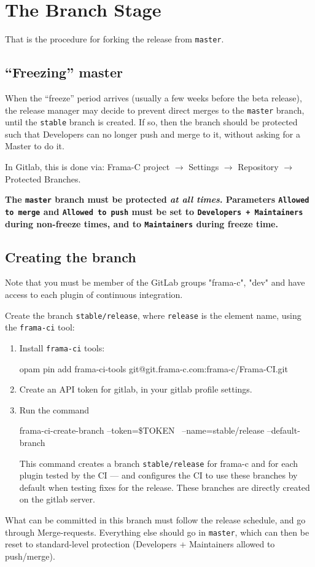 \chapter{The Branch Stage}

That is the procedure for forking the release from \texttt{master}.

\section{``Freezing'' master}

When the ``freeze'' period arrives (usually a few weeks before the beta
release), the release manager may decide to prevent direct merges to the
\texttt{master} branch, until the \texttt{stable} branch is created.
If so, then the branch should be protected such that Developers can no
longer push and merge to it, without asking for a Master to do it.

In Gitlab, this is done via: Frama-C project $\rightarrow$ Settings
$\rightarrow$ Repository $\rightarrow$ Protected Branches.

\textbf{The \texttt{master} branch must be protected \emph{at all times}.
  Parameters
  \texttt{Allowed to merge} and \texttt{Allowed to push} must be set to
  \texttt{Developers + Maintainers} during non-freeze times, and to
  \texttt{Maintainers} during freeze time.}

\section{Creating the branch}

Note that you must be member of the GitLab groups "frama-c", "dev" and have
access to each plugin of continuous integration.

Create the branch \texttt{stable/release}, where \texttt{release} is the
element name, using the \texttt{frama-ci} tool:
\begin{enumerate}
\item Install \texttt{frama-ci} tools:
\begin{shell}
opam pin add frama-ci-tools git@git.frama-c.com:frama-c/Frama-CI.git
\end{shell}
\item Create an API token for gitlab, in your gitlab profile settings.
\item Run the command
\begin{shell}
frama-ci-create-branch --token=\$TOKEN \
--name=stable/release --default-branch
\end{shell}
This command creates a branch \texttt{stable/release} for frama-c and for
each plugin tested by the CI — and configures the CI to use these branches
by default when testing fixes for the release.
These branches are directly created on the gitlab server.
\end{enumerate}
What can be committed in this branch must follow the release schedule,
and go through Merge-requests. Everything else should go in \texttt{master},
which can then be reset to standard-level protection (Developers + Maintainers
allowed to push/merge).

